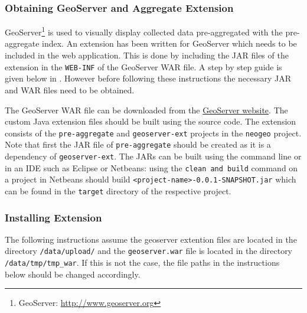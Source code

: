 \subsubsection{Obtaining GeoServer and Aggregate Extension}

GeoServer\footnote{GeoServer: \url{http://www.geoserver.org}} is used to
visually display collected data pre-aggregated with the pre-aggregate
index. An extension has been written for
GeoServer which needs to be included in the web application. This is done
by including the JAR files of the extension in the \lstinline|WEB-INF| of
the GeoServer WAR file. A step by step guide is given below in
. However before following these instructions
the necessary JAR and WAR files need to be obtained.

The GeoServer WAR file can be downloaded from the
\href{http://www.geoserver.org/download/}{\textsf{GeoServer website}}. The
custom Java extension files should be built using the source code. The
extension consists of the \lstinline|pre-aggregate| and
\lstinline|geoserver-ext| projects in the \lstinline|neogeo| project. Note
that first the JAR file of \lstinline|pre-aggregate| should be created as
it is a dependency of \lstinline|geoserver-ext|. The JARs can be built
using the command line or in an IDE such as Eclipse or Netbeans: using the
\lstinline|clean and build| command on a project in Netbeans should build
\lstinline|<project-name>-0.0.1-SNAPSHOT.jar| which can be found in the
\lstinline|target| directory of the respective project.

\subsubsection{Installing Extension}
\label{sec:InstallExtension}

The following instructions assume the geoserver extention files are located
in the directory \lstinline|/data/upload/| and the
\lstinline|geoserver.war| file is located in the directory
\mbox{\lstinline|/data/tmp/tmp_war|}. If this is not the case, the file
paths in the instructions below should be changed accordingly.

